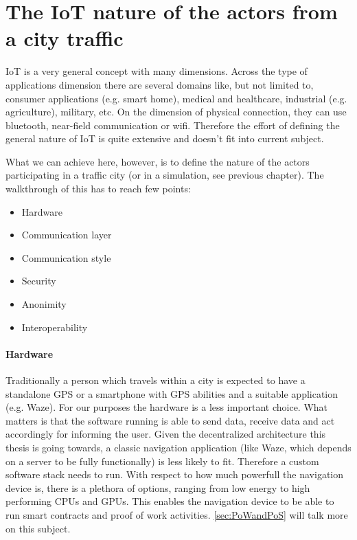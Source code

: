 \documentclass[a4paper,12pt,twoside]{book}
\begin{document}
\section{The IoT nature of the actors from a city traffic}
\label{sec:IoTNature}

    IoT is a very general concept with many dimensions. Across the type of applications dimension there are several domains like, but not limited to, consumer applications (e.g. smart home), medical and healthcare, industrial (e.g. agriculture), military, etc. On the dimension of physical connection, they can use bluetooth, near-field communication or wifi. Therefore the effort of defining the general nature of IoT is quite extensive and doesn't fit into current subject.

    What we can achieve here, however, is to define the nature of the actors participating in a traffic city (or in a simulation, see previous chapter). The walkthrough of this has to reach few points:

    \begin{itemize}
        \item Hardware
        \item Communication layer
        \item Communication style
        \item Security
        \item Anonimity
        \item Interoperability
    \end{itemize}

    \paragraph{Hardware} Traditionally a person which travels within a city is expected to have a standalone GPS or a smartphone with GPS abilities and a suitable application (e.g. Waze). For our purposes the hardware is a less important choice. What matters is that the software running is able to send data, receive data and act accordingly for informing the user. Given the decentralized architecture this thesis is going towards, a classic navigation application (like Waze, which depends on a server to be fully functionally) is less likely to fit. Therefore a custom software stack needs to run. With respect to how much powerfull the navigation device is, there is a plethora of options, ranging from low energy to high performing CPUs and GPUs. This enables the navigation device to be able to run smart contracts and proof of work activities. \ref{sec:PoWandPoS} will talk more on this subject.
\end{document}
